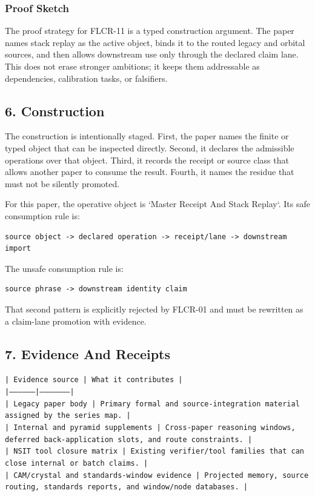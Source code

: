 \documentclass[11pt]{article}
\begin{document}
\subsubsection*{Proof Sketch}

The proof strategy for FLCR-11 is a typed construction argument. The paper names stack replay as the active object, binds it to the routed legacy and orbital sources, and then allows downstream use only through the declared claim lane. This does not erase stronger ambitions; it keeps them addressable as dependencies, calibration tasks, or falsifiers.

\subsection*{6. Construction}

The construction is intentionally staged. First, the paper names the finite or
typed object that can be inspected directly. Second, it declares the admissible
operations over that object. Third, it records the receipt or source class that
allows another paper to consume the result. Fourth, it names the residue that
must not be silently promoted.

For this paper, the operative object is `Master Receipt And Stack Replay`. Its safe consumption
rule is:

\begin{verbatim}
source object -> declared operation -> receipt/lane -> downstream import
\end{verbatim}

The unsafe consumption rule is:

\begin{verbatim}
source phrase -> downstream identity claim
\end{verbatim}

That second pattern is explicitly rejected by FLCR-01 and must be rewritten as
a claim-lane promotion with evidence.

\subsection*{7. Evidence And Receipts}

\noindent\texttt{| Evidence source | What it contributes |}\\
\noindent\texttt{|-----------------|---------------------|}\\
\noindent\texttt{| Legacy paper body | Primary formal and source-integration material assigned by the series map. |}\\
\noindent\texttt{| Internal and pyramid supplements | Cross-paper reasoning windows, deferred back-application slots, and route constraints. |}\\
\noindent\texttt{| NSIT tool closure matrix | Existing verifier/tool families that can close internal or batch claims. |}\\
\noindent\texttt{| CAM/crystal and standards-window evidence | Projected memory, source routing, standards reports, and window/node databases. |}\\
\end{document}
